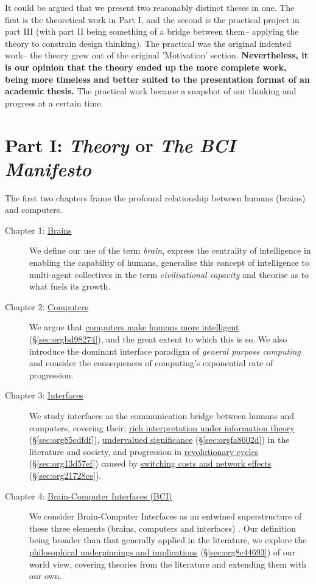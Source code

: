 \documentclass[logo,bsc,singlespacing,parskip]{infthesis}
\begin{document}
It could be argued that we present two reasonably distinct theses in one.
The first is the theoretical work in Part I, and the second is the practical project in part III (with part II being something of a bridge between them-- applying the theory to constrain design thinking).
The practical was the original indented work-- the theory grew out of the original 'Motivation' section.
\textbf{Nevertheless, it is our opinion that the theory ended up the more complete work, being more timeless and better suited to the presentation format of an academic thesis.}
The practical work became a snapshot of our thinking and progress at a certain time.
\section*{Part I: \emph{Theory} or \emph{The BCI Manifesto}}
\label{sec:orgd2603ec}
The first two chapters frame the profound relationship between humans (brains) and computers.

\begin{description}
\item[{Chapter 1: \hyperref[sec:org91d74ae]{Brains}}] We define our use of the term \emph{brain}, express the centrality of intelligence in enabling the capability of humans, generalise this concept of intelligence to multi-agent collectives in the term \emph{civilisational capacity} and theorise as to what fuels its growth.

\item[{Chapter 2: \hyperref[sec:org4247982]{Computers}}] We argue that \hyperref[sec:orgbd98274]{computers make humans more intelligent} (\S \ref{sec:orgbd98274}), and the great extent to which this is so.
We also introduce the dominant interface paradigm of \emph{general purpose computing} and consider the consequences of computing's exponential rate of progression.

\item[{Chapter 3: \hyperref[sec:org0e55331]{Interfaces}}] We study interfaces as the communication bridge between humans and computers, covering their;  \hyperref[sec:org85cdfdf]{rich interpretation under information theory} (\S \ref{sec:org85cdfdf}), \hyperref[sec:orgfa8602d]{undervalued significance} (\S \ref{sec:orgfa8602d}) in the literature and society, and progression in \hyperref[sec:org13d57ef]{revolutionary cycles} (\S \ref{sec:org13d57ef}) caused by \hyperref[sec:org21728ce]{switching costs and network effects} (\S \ref{sec:org21728ce}).

\item[{Chapter 4: \hyperref[sec:orgd478241]{Brain-Computer Interfaces (BCI)}}] We consider Brain-Computer Interfaces as an entwined superstructure of these three elements (brains, computers and interfaces) . Our definition being broader than that generally applied in the literature, we explore the \hyperref[sec:org8c44693]{philosophical underpinnings and implications} (\S \ref{sec:org8c44693}) of our world view, covering theories from the literature and extending them with our own.
\end{description}
\end{document}
